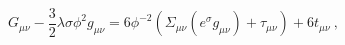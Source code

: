 \begin{equation}
G_{\mu \nu}-\frac{3}{2}\lambda \sigma \phi^2 g_{\mu\nu}
=6\phi^{-2}(\Sigma_{\mu \nu}(e^{\sigma}g_{\mu
\nu})+\tau_{\mu\nu})+ 6t_{\mu\nu}~, \label{5}\end{equation}

